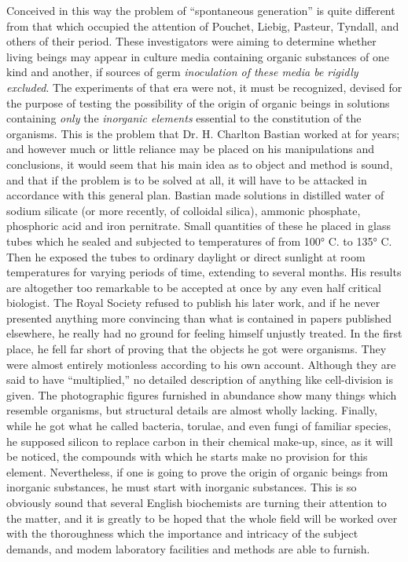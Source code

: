 \documentclass[a4paper, 11pt, oneside, polutonikogreek, english]{article}
\begin{document}
Conceived in this way the problem of ``spontaneous generation'' is quite different from that which occupied the attention of Pouchet, Liebig, Pasteur, Tyndall, and others of their period. These investigators were aiming to determine whether living beings may appear in culture media containing organic substances of one kind and another, if sources of germ \emph{inoculation of these media be rigidly excluded}. The experiments of that era were not, it must be recognized, devised for the purpose of testing the possibility of the origin of organic beings in solutions containing \emph{only} the \emph{inorganic elements} essential to the constitution of the organisms. This is the problem that Dr. H. Charlton Bastian worked at for years; and however much or little reliance may be placed on his manipulations and conclusions, it would seem that his main idea as to object and method is sound, and that if the problem is to be solved at all, it will have to be attacked in accordance with this general plan. Bastian made solutions in distilled water of sodium silicate (or more recently, of colloidal silica), ammonic phosphate, phosphoric acid and iron pernitrate. Small quantities of these he placed in glass tubes which he sealed and subjected to temperatures of from 100° C. to 135° C. Then he exposed the tubes to ordinary daylight or direct sunlight at room temperatures for varying periods of time, extending to several months. His results are altogether too remarkable to be accepted at once by any even half critical biologist. The Royal Society refused to publish his later work, and if he never presented anything more convincing than what is contained in papers published elsewhere, he really had no ground for feeling himself unjustly treated. In the first place, he fell far short of proving that the objects he got were organisms. They were almost entirely motionless according to his own account. Although they are said to have ``multiplied,'' no detailed description of anything like cell-division is given. The photographic figures furnished in abundance show many things which resemble organisms, but structural details are almost wholly lacking. Finally, while he got what he called bacteria, torulae, and even fungi of familiar species, he supposed silicon to replace carbon in their chemical make-up, since, as it will be noticed, the compounds with which he starts make no provision for this element. Nevertheless, if one is going to prove the origin of organic beings from inorganic substances, he must start with inorganic substances. This is so obviously sound that several English biochemists are turning their attention to the matter, and it is greatly to be hoped that the whole field will be worked over with the thoroughness which the importance and intricacy of the subject demands, and modem laboratory facilities and methods are able to furnish.
\end{document}
